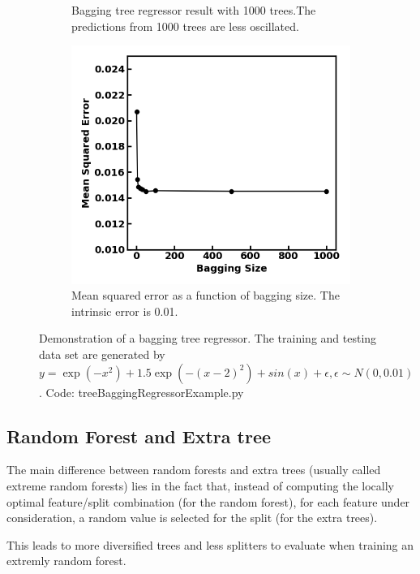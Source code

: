 \begin{refsection}
\begin{figure}[H]
\begin{subfigure}[b]{0.42\textwidth}
		\caption{Bagging tree regressor result with 1000 trees.The predictions from 1000 trees are less oscillated. }
	\end{subfigure}\quad
	\begin{subfigure}[b]{0.42\textwidth}
		\centering
		\includegraphics[width=1\linewidth]{../figures/statisticalLearning/treeMethods/BaggingTreeRegressorExampleAccuracy}
		\caption{Mean squared error as a function of bagging size. The intrinsic error is 0.01.}
		\label{fig:BaggingTreeRegressionDemo}
	\end{subfigure}
	\caption{Demonstration of a bagging tree regressor. The training and testing data set are generated by $y = \exp(-x^2) + 1.5\exp(-(x-2)^2) + sin(x) + \epsilon, \epsilon\sim N(0,0.01)$. Code: treeBaggingRegressorExample.py}
\end{figure}


\subsection{Random Forest and Extra tree}

The main difference between random forests and extra trees (usually called extreme random forests) lies in the fact that, instead of computing the locally optimal feature/split combination (for the random forest), for each feature under consideration, a random value is selected for the split (for the extra trees).

This leads to more diversified trees and less splitters to evaluate when training an extremly random forest.






\end{refsection}
